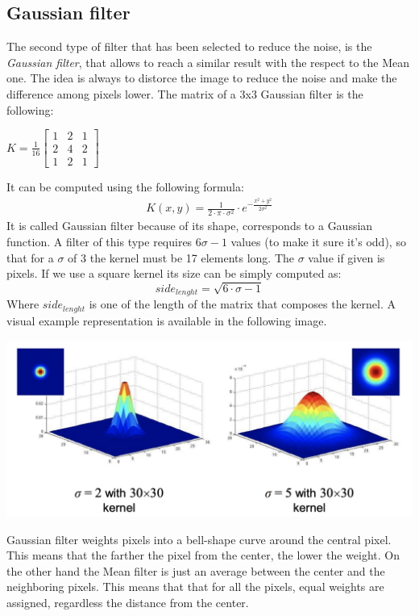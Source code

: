 \documentclass[paper=a4, fontsize=10pt]{scrartcl}	%
\begin{document}
	\subsection{Gaussian filter}
	The second type of filter that has been selected to reduce the noise, is the \textit{Gaussian filter}, that allows to reach a similar result with the respect to the Mean one. The idea is always to distorce the image to reduce the noise and make the difference among pixels lower. The matrix of a 3x3 Gaussian filter is the following:
		\begin{center}
		$
		K = \frac{1}{16}\begin{bmatrix}
			1 & 2 & 1\\
			2 & 4 & 2\\
			1 & 2 & 1
		\end{bmatrix}
		$
	\end{center}
	It can be computed using the following formula:
	\begin{align*}
		K(x,y) = \frac{1}{2 \cdot \pi \cdot \sigma^2}\cdot e^{-\frac{x^2 + y^2}{2 \sigma^2}}
	\end{align*}
	It is called Gaussian filter because of its shape, corresponds to a Gaussian function. A filter of this type requires $6 \sigma - 1$ values (to make it sure it's odd), so that for a $\sigma$ of 3 the kernel must be 17 elements long. The $\sigma$ value if given is pixels. If we use a square kernel its size can be simply computed as:
	\[
		side_{lenght} = \sqrt{6 \cdot \sigma - 1}
	\]
	Where $side_{lenght}$ is one of the length of the matrix that composes the kernel. A visual example representation is available in the following image.
	\begin{center}
		\includegraphics[width=0.45\linewidth]{images/heatmap/sigma_representation}
	\end{center}
	Gaussian filter weights pixels into a bell-shape curve around the central pixel. This means that the farther the pixel from the center, the lower the weight. On the other hand the Mean filter is just an average between the center and the neighboring pixels. This means that that for all the pixels, equal weights are assigned, regardless the distance from the center.
\end{document}
